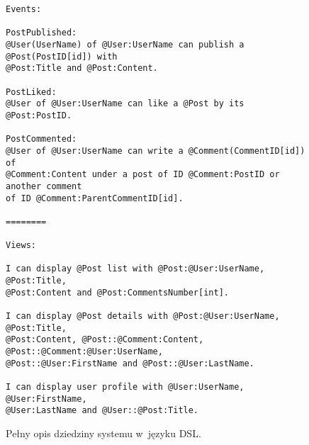\begin{figure}[!ht]
\begin{verbatim}
Events:

PostPublished:
@User(UserName) of @User:UserName can publish a @Post(PostID[id]) with
@Post:Title and @Post:Content.

PostLiked:
@User of @User:UserName can like a @Post by its @Post:PostID.

PostCommented:
@User of @User:UserName can write a @Comment(CommentID[id]) of
@Comment:Content under a post of ID @Comment:PostID or another comment
of ID @Comment:ParentCommentID[id].

========

Views:

I can display @Post list with @Post:@User:UserName, @Post:Title,
@Post:Content and @Post:CommentsNumber[int].

I can display @Post details with @Post:@User:UserName, @Post:Title,
@Post:Content, @Post::@Comment:Content, @Post::@Comment:@User:UserName,
@Post::@User:FirstName and @Post::@User:LastName.

I can display user profile with @User:UserName, @User:FirstName,
@User:LastName and @User::@Post:Title.

\end{verbatim}
\caption{
 Pełny opis dziedziny systemu w~języku DSL.
}
\label{fig:dsl:model_dsl}
\end{figure}
